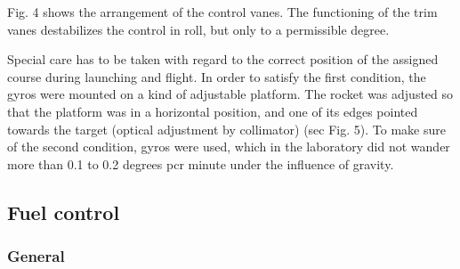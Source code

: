 \documentclass[11pt, a4paper]{article}
\begin{document}
Fig. 4 shows the arrangement of the control vanes. The functioning of the trim vanes destabilizes the control in roll, but only to a permissible degree.


Special care has to be taken with regard to the correct position of the
assigned course during launching and flight. In order to satisfy the first
condition, the gyros were mounted on a kind of adjustable platform. The rocket
was adjusted so that the platform was in a horizontal position, and one of its
edges pointed towards the target (optical adjustment by collimator) (sec Fig. 5).
To make sure of the second condition, gyros were used, which in the laboratory
did not wander more than 0.1 to 0.2 degrees pcr minute under the influence
of gravity.

\subsection{Fuel control}

\subsubsection{General}
\end{document}
